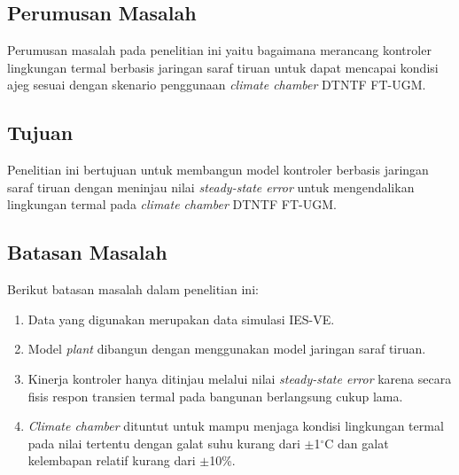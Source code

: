 \documentclass[a4paper,10pt]{article}
\newenvironment{body}{\begin{multicols}{2}}{\end{multicols}}
\begin{document}
\begin{body}
		\subsection{Perumusan Masalah}
		Perumusan masalah pada penelitian ini yaitu bagaimana merancang kontroler lingkungan termal berbasis jaringan saraf tiruan untuk dapat mencapai kondisi ajeg sesuai dengan skenario penggunaan \textit{climate chamber} DTNTF FT-UGM.\\
		
		\subsection{Tujuan}
		Penelitian ini bertujuan untuk membangun model kontroler berbasis jaringan saraf tiruan dengan meninjau nilai \textit{steady-state error} untuk mengendalikan lingkungan termal pada \textit{climate chamber} DTNTF FT-UGM.\\
		
		\subsection{Batasan Masalah}
		Berikut batasan masalah dalam penelitian ini:
		\begin{enumerate}
			\item Data yang digunakan merupakan data simulasi IES-VE.
			\item Model \textit{plant} dibangun dengan menggunakan model jaringan saraf tiruan.
			\item Kinerja kontroler hanya ditinjau melalui nilai \textit{steady-state error} karena secara fisis respon transien termal pada bangunan berlangsung cukup lama.
			\item \textit{Climate chamber} dituntut untuk mampu menjaga kondisi lingkungan termal pada nilai tertentu dengan galat suhu kurang dari $\pm$1$^{\circ}$C dan galat kelembapan relatif kurang dari $\pm$10\%.
		\end{enumerate}
		
		\vspace{2mm}
		

\end{body}
\end{document}
